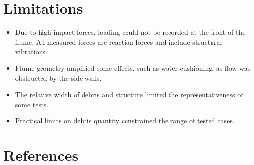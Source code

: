 \documentclass{article}
\begin{document}
\section{Limitations}
\begin{itemize}
    \item Due to high impact forces, loading could not be recorded at the front of the flume. All measured forces are reaction forces and include structural vibrations.
    \item Flume geometry amplified some effects, such as water cushioning, as flow was obstructed by the side walls.
    \item The relative width of debris and structure limited the representativeness of some tests.
    \item Practical limits on debris quantity constrained the range of tested cases.
\end{itemize}
\section{References}
\end{document}

